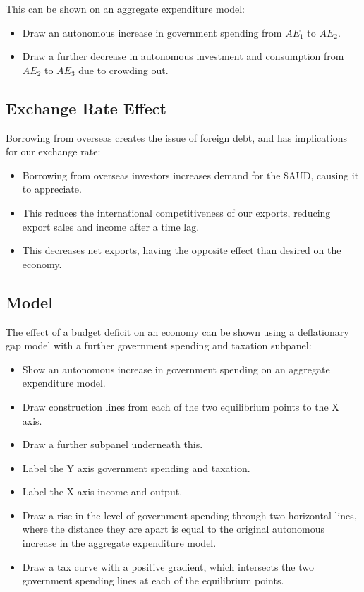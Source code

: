 \documentclass[a4paper,11pt]{article}
\begin{document}
This can be shown on an aggregate expenditure model:

\begin{itemize}
\item Draw an autonomous increase in government spending from $AE_1$ to $AE_2$.
\item Draw a further decrease in autonomous investment and consumption from
	$AE_2$ to $AE_3$ due to crowding out.
\end{itemize}


\subsection{Exchange Rate Effect}

Borrowing from overseas creates the issue of foreign debt, and has implications
for our exchange rate:

\begin{itemize}
\item Borrowing from overseas investors increases demand for the \$AUD, causing
	it to appreciate.
\item This reduces the international competitiveness of our exports, reducing
	export sales and income after a time lag.
\item This decreases net exports, having the opposite effect than desired on
	the economy.
\end{itemize}


\subsection{Model}

The effect of a budget deficit on an economy can be shown using a deflationary
gap model with a further government spending and taxation subpanel:

\begin{itemize}
\item Show an autonomous increase in government spending on an aggregate
	expenditure model.
\item Draw construction lines from each of the two equilibrium points to the
	X axis.
\item Draw a further subpanel underneath this.
\item Label the Y axis government spending and taxation.
\item Label the X axis income and output.
\item Draw a rise in the level of government spending through two horizontal
	lines, where the distance they are apart is equal to the original autonomous
	increase in the aggregate expenditure model.
\item Draw a tax curve with a positive gradient, which intersects the two
	government spending lines at each of the equilibrium points.
\end{itemize}
\end{document}
